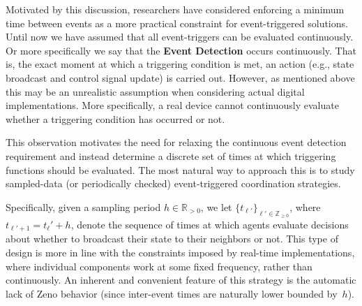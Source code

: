 \documentclass{autart}
\newcommand{\realpositive}{\mathbb{R}_{>0}}
\newcommand{\integernonnegative}{\mathbb{Z}_{\ge 0}}
\begin{document}
Motivated by this discussion, researchers have considered enforcing a
minimum time between events as a more practical constraint for
event-triggered solutions.  Until now we have assumed that all
event-triggers can be evaluated continuously. Or more specifically we
say that the \textbf{Event Detection} occurs continuously.  That is,
the exact moment at which a triggering condition is met, an action
(e.g., state broadcast and control signal update) is carried
out. However, as mentioned above this may be an unrealistic assumption
when considering actual digital implementations. More specifically, a
real device cannot continuously evaluate whether a triggering
condition has occurred or not.

This observation motivates the need for relaxing the continuous event
detection requirement and instead determine a discrete set of times at
which triggering functions should be evaluated.  The most natural way
to approach this is to study sampled-data (or periodically checked)
event-triggered coordination strategies.

Specifically, given a sampling period $h \in \realpositive$, we let
$\{ t_{\ell'} \}_{\ell' \in \integernonnegative}$, where
$t_{\ell'+1} = t_\ell' + h$, denote the sequence of times at which
agents evaluate decisions about whether to broadcast their state to
their neighbors or not. This type of design is more in line with the
constraints imposed by real-time implementations, where individual
components work at some fixed frequency, rather than continuously. An
inherent and convenient feature of this strategy is the automatic lack
of Zeno behavior (since inter-event times are naturally lower bounded
by~$h$).
\end{document}
